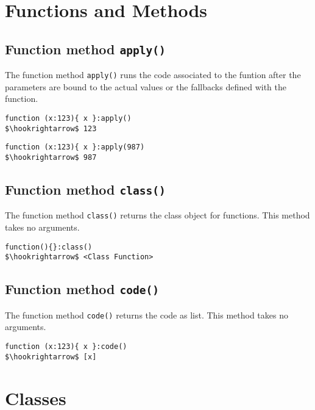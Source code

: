 \documentclass[11pt,a4paper]{scrbook}
\begin{document}
\section{Functions and Methods}



\subsection{Function method \texttt{apply()}}

The function method \texttt{apply()} runs the code associated to the funtion
after the parameters are bound to the actual values or the fallbacks defined
with the function.

\begin{lstlisting}[language=BibTool,mathescape=true]
function (x:123){ x }:apply()
$\hookrightarrow$ 123
\end{lstlisting}

\begin{lstlisting}[language=BibTool,mathescape=true]
function (x:123){ x }:apply(987)
$\hookrightarrow$ 987
\end{lstlisting}


\subsection{Function method \texttt{class()}}

The function method \texttt{class()} returns the class object for functions.
This method takes no arguments.

\begin{lstlisting}[language=BibTool,mathescape=true]
function(){}:class()
$\hookrightarrow$ <Class Function>
\end{lstlisting}

\subsection{Function method \texttt{code()}}

The function method \texttt{code()} returns the code as list. This method
takes no arguments.

\begin{lstlisting}[language=BibTool,mathescape=true]
function (x:123){ x }:code()
$\hookrightarrow$ [x]
\end{lstlisting}


\section{Classes}\label{sec:classes}
\end{document}
